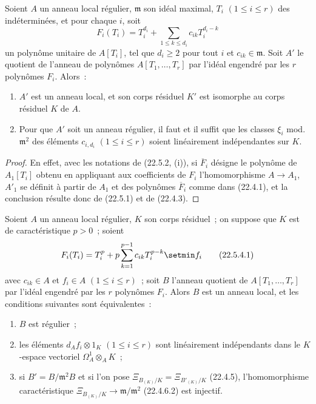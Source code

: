\begin{corollary}[22.5.3]
\label{0.22.5.3-fr}
Soient $A$ un anneau local régulier, $\mathfrak m$ son idéal maximal,
$T_i$ $(1\leqslant i\leqslant r)$ des indéterminées, et pour chaque $i$, soit
\begin{equation}
\label{0.22.5.3.1-fr}
  F_i(T_i)=T_i^{d_i}+\sum_{1\leqslant k\leqslant d_i}c_{ik}T_i^{d_i-k}
  \tag{22.5.3.1}
\end{equation}
un polynôme unitaire de $A[T_i]$, tel que $d_i\geqslant2$ pour tout $i$ et
$c_{ik}\in\mathfrak m$. Soit $A'$ le quotient de l'anneau de polynômes
$A[T_1,\ldots,T_r]$ par l'idéal engendré par les $r$ polynômes $F_i$. Alors~:
\begin{enumerate}
  \item[\rm(i)] $A'$ est un anneau local, et son corps résiduel $K'$ est
  isomorphe au corps résiduel $K$ de $A$.
  \item[\rm(ii)] Pour que $A'$ soit un anneau régulier, il faut et il suffit
  que les classes $\xi_i$ \textup{mod.}~$\mathfrak m^2$ des éléments $c_{i,d_i}$
  $(1\leqslant i\leqslant r)$ soient linéairement indépendantes sur $K$.
\end{enumerate}
\end{corollary}

\begin{proof}
En effet, avec les notations de (22.5.2, (i)), si $\overline F_i$ désigne le
polynôme de $A_1[T_i]$ obtenu en appliquant aux coefficients de $F_i$
l'homomorphisme $A\longrightarrow A_1$, $A'_1$ se définit à partir de $A_1$ et
des polynômes $\overline F_i$ comme dans (22.4.1), et la conclusion résulte
donc de (22.5.1) et de (22.4.3).
\end{proof}

\begin{theorem}[22.5.4]
\label{0.22.5.4-fr}
Soient $A$ un anneau local régulier, $K$ son corps résiduel~; on suppose que
$K$ est de caractéristique $p>0$~; soient
\begin{equation}
\label{0.22.5.4.1-fr}
  F_i(T_i)=T_i^p+p\sum_{k=1}^{p-1}c_{ik}T_i^{p-k}\setmin f_i
  \tag{22.5.4.1}
\end{equation}
avec $c_{ik}\in A$ et $f_i\in A$ $(1\leqslant i\leqslant r)$~; soit $B$
l'anneau quotient de $A[T_1,\ldots,T_r]$ par l'idéal engendré par les $r$
polynômes $F_i$. Alors $B$ est un anneau local, et les conditions suivantes
sont équivalentes~:
\begin{enumerate}
  \item[\textup{a)}] $B$ est régulier~;
  \item[\textup{b)}] les éléments $d_Af_i\otimes1_K$ $(1\leqslant i\leqslant r)$ sont
  linéairement indépendants dans le $K$-espace vectoriel
  $\Omega^1_A\otimes_AK$~;
  \item[\textup{c)}] si $B'=B/\mathfrak m^2B$ et si l'on pose
  $\Xi_{B_{(K)}/K}=\Xi_{B'_{(K)}/K}$ \textup{(22.4.5)}, l'homomorphisme
  caractéristique $\Xi_{B_{(K)}/K}\longrightarrow\mathfrak m/\mathfrak m^2$
  \textup{(22.4.6.2)} est injectif.
\end{enumerate}
\end{theorem}

